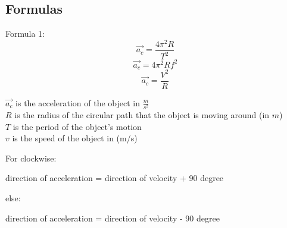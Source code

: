 \subsection{Formulas}
\begin{cyanblock}
    Formula 1:
    \[
        \vec{a_{c}} = \frac{4 \pi ^2 R}{T^2}
    \]
    \[
        \vec{a_{c}} = 4\pi ^2 R f^2
    \]
    \[
        \vec{a_{c}} = \frac{V^2}{R}
    \]
    \begin{center}
        $\vec{a_{c}}$ is the acceleration of the object in $\frac{m}{s^2}$\\
        $R$ is the radius of the circular path that the object is moving around (in $m$)\\
        $T$ is the period of the object's motion \\
        $v$ is the speed of the object in (m/s)
    \end{center}
\end{cyanblock}

\begin{cyanblock}
    For clockwise:
    \begin{center}
        direction of acceleration = direction of velocity + 90 degree
    \end{center}
    else:
    \begin{center}
         direction of acceleration = direction of velocity - 90 degree
    \end{center}
\end{cyanblock}